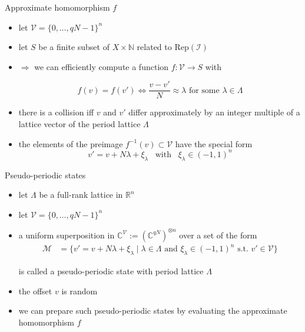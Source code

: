 \documentclass[slideColor]{prosper}
\renewcommand{\R}{\mathbb{R}}
\renewcommand{\>}{\rangle}
\newcommand{\<}{\langle}
\begin{document}
\begin{slide}{Approximate homomorphism $f$}

\vspace{-0.2cm}
\begin{itemize}
\item let $\mathcal{V}=\{0,\ldots,qN-1\}^n$ 

\medskip
\item let $S$ be a finite subset of $X\times\mathbb{N}$ related to $\mathrm{Rep}(\mathcal{I})$

\medskip
\item $\Rightarrow$ we can efficiently compute a function $f : \mathcal{V} \rightarrow S$ with

\[
	f(v)=f(v') \Leftrightarrow \frac{v-v'}{N} \approx \lambda \mbox{ for some $\lambda\in\Lambda$}
\]

\item there is a collision iff $v$ and $v'$ differ approximately by an integer multiple of a lattice vector of the period lattice $\Lambda$

\medskip
\item the elements of the preimage $f^{-1}(v)\subset\mathcal{V}$ have the special form
\[
	v' = v + N \lambda + \xi_\lambda \;\;\;\mbox{with}\;\;\; \xi_\lambda\in(-1,1)^n
\]
\end{itemize}

\end{slide}



\begin{slide}{Pseudo-periodic states}
\vspace{-0.25cm}
\begin{itemize}
\item let $\Lambda$ be a full-rank lattice in $\R^n$

\medskip
\item let $\mathcal{V}=\{0,\ldots,qN-1\}^n$

\bigskip
\item a uniform superposition in $\mathbb{C}^\mathcal{V}:={(\mathbb{C}^{qN})}^{\otimes n}$ over a set of the form
\begin{align*}
\mathcal{M}  & = \{ v' = v + N \lambda + \xi_\lambda \mid \lambda\in\Lambda \text{ and } \xi_\lambda\in(-1,1)^n \text{ s.t. } v'\in\mathcal{V} \}
\end{align*}

is called a pseudo-periodic state with period lattice $\Lambda$

\bigskip
\item the offset $v$ is random

\medskip
\item we can prepare such pseudo-periodic states by evaluating the approximate homomorphism $f$ 
\end{itemize}
\end{slide}
\end{document}
